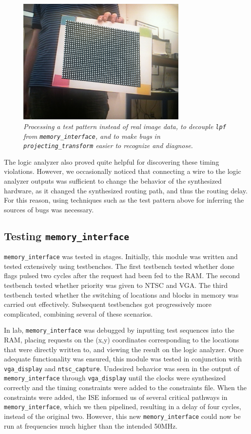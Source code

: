 \documentclass[10pt]{article}
\begin{document}
\begin{figure}[h!]
\centering
\includegraphics[width=0.75\textwidth]{images/IMG_0121.JPG}
\caption{\emph{Processing a test pattern instead of real image data, to decouple {\tt lpf} from {\tt memory\_interface}, and to make bugs in {\tt projecting\_transform} easier to recognize and diagnose.}}
\end{figure}

The logic analyzer also proved quite helpful for discovering these timing violations. However, we occasionally noticed that connecting a wire to the logic analyzer outputs was sufficient to change the behavior of the synthesized hardware, as it changed the synthesized routing path, and thus the routing delay. For this reason, using techniques such as the test pattern above for inferring the sources of bugs was necessary.

\subsection{Testing {\tt memory\_interface}}
{\tt memory\_interface} was tested in stages. Initially, this module was written and tested extensively using testbenches. The first testbench tested whether done flags pulsed two cycles after the request had been fed to the RAM. The second testbench tested whether priority was given to NTSC and VGA. The third testbench tested whether the switching of locations and blocks in memory was carried out effectively. Subsequent testbenches got progressively more complicated, combining several of these scenarios.

In lab, {\tt memory\_interface} was debugged by inputting test sequences into the RAM, placing requests on the (x,y) coordinates corresponding to the locations that were directly written to, and viewing the result on the logic analyzer. Once adequate functionality was ensured, this module was tested in conjunction with {\tt vga\_display} and {\tt ntsc\_capture}. Undesired behavior was seen in the output of {\tt memory\_interface} through {\tt vga\_display} until the clocks were synthesized correctly and the timing constraints were added to the constraints file. When the constraints were added, the ISE informed us of several critical pathways in {\tt memory\_interface}, which we then pipelined, resulting in a delay of four cycles, instead of the original two. However, this new {\tt memory\_interface} could now be run at frequencies much higher than the intended 50MHz.
\end{document}
